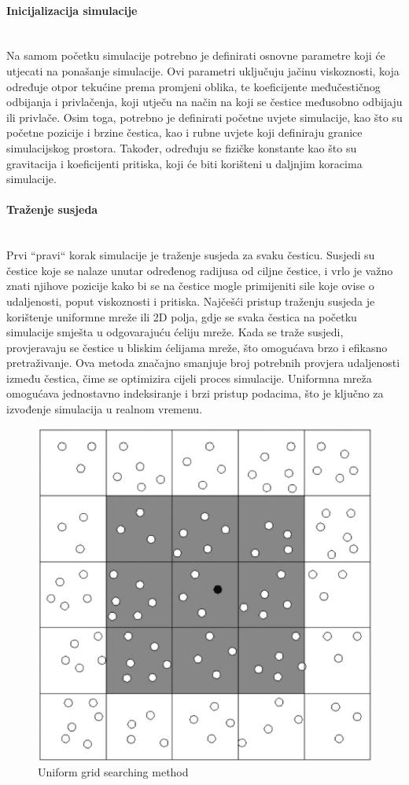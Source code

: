 \documentclass[diplomskirad]{fer}
\newcommand{\paragraphnewline}[1]{\paragraph{#1}\mbox{}\\}
\begin{document}
    \paragraphnewline{Inicijalizacija simulacije}
    Na samom početku simulacije potrebno je definirati osnovne parametre koji će utjecati na ponašanje simulacije.
    Ovi parametri uključuju jačinu viskoznosti, koja određuje otpor tekućine prema promjeni oblika, te koeficijente međučestičnog odbijanja i privlačenja, koji utječu na način na koji se čestice međusobno odbijaju ili privlače.
    Osim toga, potrebno je definirati početne uvjete simulacije, kao što su početne pozicije i brzine čestica, kao i rubne uvjete koji definiraju granice simulacijskog prostora.
    Također, određuju se fizičke konstante kao što su gravitacija i koeficijenti pritiska, koji će biti korišteni u daljnjim koracima simulacije.

    \paragraphnewline{Traženje susjeda}
    Prvi ``pravi`` korak simulacije je traženje susjeda za svaku česticu.
    Susjedi su čestice koje se nalaze unutar određenog radijusa od ciljne čestice, i vrlo je važno znati njihove pozicije kako bi se na čestice mogle primijeniti sile koje ovise o udaljenosti, poput viskoznosti i pritiska.
    Najčešći pristup traženju susjeda je korištenje uniformne mreže ili 2D polja, gdje se svaka čestica na početku simulacije smješta u odgovarajuću ćeliju mreže.
    Kada se traže susjedi, provjeravaju se čestice u bliskim ćelijama mreže, što omogućava brzo i efikasno pretraživanje.
    Ova metoda značajno smanjuje broj potrebnih provjera udaljenosti između čestica, čime se optimizira cijeli proces simulacije.
    Uniformna mreža omogućava jednostavno indeksiranje i brzi pristup podacima, što je ključno za izvođenje simulacija u realnom vremenu.

    \begin{figure}[H]
        \centering
        \includegraphics[scale=0.3]{images/Uniform-grid-searching-method}
        \caption{
            Uniform grid searching method \cite{uniformGridSearchingMethod}
        }
        \label{fig:uniformGridSearchingMethod}
    \end{figure}
\end{document}
